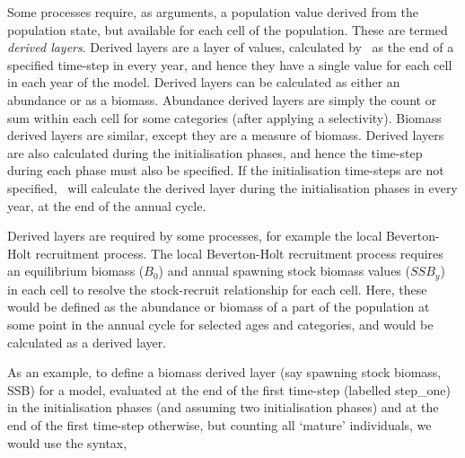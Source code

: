 Some processes require, as arguments, a population value derived from the population state, but available for each cell of the population. These are termed \emph{derived layers}. Derived layers are a layer of values, calculated by \SPM\ as the end of a specified time-step in every year, and hence they have a single value for each cell in each year of the model. Derived layers can be calculated as either an abundance or as a biomass. Abundance derived layers are simply the count or sum within each cell for some categories (after applying a selectivity). Biomass derived layers are similar, except they are a measure of biomass. Derived layers are also calculated during the initialisation phases, and hence the time-step during each phase must also be specified. If the initialisation time-steps are not specified, \SPM\ will calculate the derived layer during the initialisation phases in every year, at the end of the annual cycle.

Derived layers are required by some processes, for example the local Beverton-Holt recruitment process. The local Beverton-Holt recruitment process requires an equilibrium biomass ($B_0$) and annual spawning stock biomass values ($SSB_y$) in each cell to resolve the stock-recruit relationship for each cell. Here, these would be defined as the abundance or biomass of a part of the population at some point in the annual cycle for selected ages and categories, and would be calculated as a derived layer.

As an example, to define a biomass derived layer (say spawning stock biomass, SSB) for a model, evaluated at the end of the first time-step (labelled step\_one) in the initialisation phases (and assuming two initialisation phases) and at the end of the first time-step otherwise, but counting all `mature' individuals, we would use the syntax,

